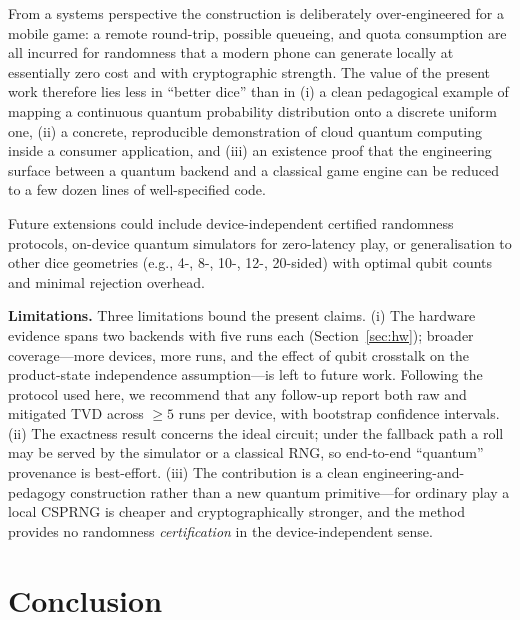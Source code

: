 \documentclass{ieeeaccess}
\begin{document}
From a systems perspective the construction is deliberately over-engineered for a mobile game: a remote round-trip, possible queueing, and quota consumption are all incurred for randomness that a modern phone can generate locally at essentially zero cost and with cryptographic strength. The value of the present work therefore lies less in ``better dice'' than in (i) a clean pedagogical example of mapping a continuous quantum probability distribution onto a discrete uniform one, (ii) a concrete, reproducible demonstration of cloud quantum computing inside a consumer application, and (iii) an existence proof that the engineering surface between a quantum backend and a classical game engine can be reduced to a few dozen lines of well-specified code.

Future extensions could include device-independent certified randomness protocols, on-device quantum simulators for zero-latency play, or generalisation to other dice geometries (e.g., 4-, 8-, 10-, 12-, 20-sided) with optimal qubit counts and minimal rejection overhead.

\textbf{Limitations.} Three limitations bound the present claims. (i) The hardware evidence spans two backends with five runs each (Section~\ref{sec:hw}); broader coverage---more devices, more runs, and the effect of qubit crosstalk on the product-state independence assumption---is left to future work. Following the protocol used here, we recommend that any follow-up report both raw and mitigated TVD across $\ge\!5$ runs per device, with bootstrap confidence intervals. (ii) The exactness result concerns the ideal circuit; under the fallback path a roll may be served by the simulator or a classical RNG, so end-to-end ``quantum'' provenance is best-effort. (iii) The contribution is a clean engineering-and-pedagogy construction rather than a new quantum primitive---for ordinary play a local CSPRNG is cheaper and cryptographically stronger, and the method provides no randomness \emph{certification} in the device-independent sense.

\section{Conclusion}
\end{document}
